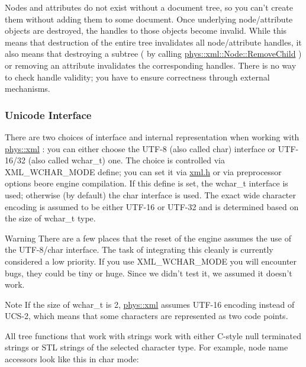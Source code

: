  \par
 Nodes and attributes do not exist without a document tree, so you can't create them without adding them to some document. Once underlying node/attribute objects are destroyed, the handles to those objects become invalid. While this means that destruction of the entire tree invalidates all node/attribute handles, it also means that destroying a subtree ( by calling \hyperlink{classphys_1_1xml_1_1Node_a946bb656b94c9d3a561200cd2cd3ee11}{phys::xml::Node::RemoveChild} ) or removing an attribute invalidates the corresponding handles. There is no way to check handle validity; you have to ensure correctness through external mechanisms. \par
 \par
 \hypertarget{XMLManual_XMLUnicode}{}\subsubsection{Unicode Interface}\label{XMLManual_XMLUnicode}
There are two choices of interface and internal representation when working with \hyperlink{namespacephys_1_1xml}{phys::xml} : you can either choose the UTF-\/8 (also called char) interface or UTF-\/16/32 (also called wchar\_\-t) one. The choice is controlled via XML\_\-WCHAR\_\-MODE define; you can set it via \hyperlink{xml_8h}{xml.h} or via preprocessor options beore engine compilation. If this define is set, the wchar\_\-t interface is used; otherwise (by default) the char interface is used. The exact wide character encoding is assumed to be either UTF-\/16 or UTF-\/32 and is determined based on the size of wchar\_\-t type. \begin{DoxyWarning}{Warning}
There are a few places that the reset of the engine assumes the use of the UTF-\/8/char interface. The task of integrating this cleanly is currently considered a low priority. If you use XML\_\-WCHAR\_\-MODE you will encounter bugs, they could be tiny or huge. Since we didn't test it, we assumed it doesn't work.
\end{DoxyWarning}
\begin{DoxyNote}{Note}
If the size of wchar\_\-t is 2, \hyperlink{namespacephys_1_1xml}{phys::xml} assumes UTF-\/16 encoding instead of UCS-\/2, which means that some characters are represented as two code points.
\end{DoxyNote}
All tree functions that work with strings work with either C-\/style null terminated strings or STL strings of the selected character type. For example, node name accessors look like this in char mode: 

